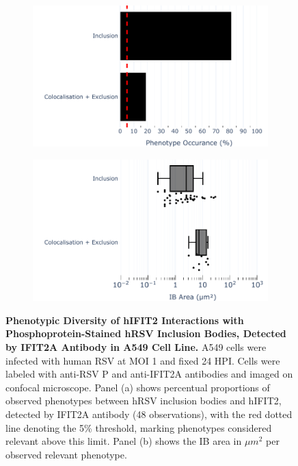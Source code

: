 \begin{figure}
    \begin{subfigure}{0.495\textwidth}
        \caption{}
        \includegraphics[width=1\linewidth]{08. Chapter 3/Figs/02. Infection/02. IFIT2/01. IFIT2A/04. bar_i2a_a549-p.pdf} 
    \end{subfigure}
    \begin{subfigure}{0.495\textwidth}
        \caption{}
        \includegraphics[width=1\linewidth]{08. Chapter 3/Figs/02. Infection/02. IFIT2/01. IFIT2A/05. box_i2a_a549-p.pdf}
    \end{subfigure}
    \caption[Phenotypic Diversity of hIFIT2 Interactions with Phosphoprotein-Stained hRSV Inclusion Bodies, Detected by IFIT2A Antibody in A549 Cell Line.]{\textbf{Phenotypic Diversity of hIFIT2 Interactions with Phosphoprotein-Stained hRSV Inclusion Bodies, Detected by IFIT2A Antibody in A549 Cell Line.} A549 cells were infected with human RSV at MOI 1 and fixed 24 HPI. Cells were labeled with anti-RSV P and anti-IFIT2A antibodies and imaged on confocal microscope. Panel (a) shows percentual proportions of observed phenotypes between hRSV inclusion bodies and hIFIT2, detected by IFIT2A antibody (48 observations), with the red dotted line denoting the 5\% threshold, marking phenotypes considered relevant above this limit. Panel (b) shows the IB area in \(\mu m^2\) per observed relevant phenotype.}
    \label{fig:Phenotypic Diversity of hIFIT2 Interactions with Phosphoprotein-Stained hRSV Inclusion Bodies, Detected by IFIT2A Antibody in A549 Cell Line}
\end{figure}

